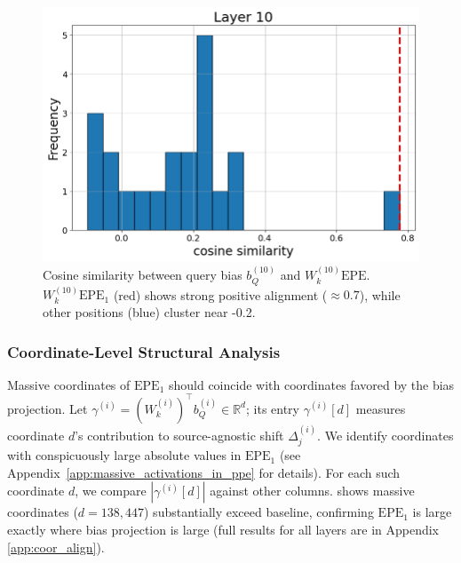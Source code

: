 \documentclass[11pt]{article}
\begin{document}
\begin{figure}[t]
  \includegraphics[width=\columnwidth]{figures/obs2_layer10.png}
  \caption{Cosine similarity between query bias $b_Q^{(10)}$ and $W_k^{(10)}\mathrm{EPE}$. $W_k^{(10)}\mathrm{EPE}_1$ (red) shows strong positive alignment ($\approx 0.7$), while other positions (blue) cluster near -0.2.}
  \label{fig:obs2_layer10}
\end{figure}

\subsubsection{Coordinate-Level Structural Analysis}
\label{sec:wk_structure}
Massive coordinates of $\mathrm{EPE}_1$ should coincide with coordinates favored by the bias projection. Let $\gamma^{(i)}=(W_k^{(i)})^\top b_Q^{(i)}\in\mathbb{R}^d$; its entry $\gamma^{(i)}[d]$ measures coordinate $d$'s contribution to source-agnostic shift $\Delta_j^{(i)}$. We identify coordinates with conspicuously large absolute values in 
$\mathrm{EPE}_1$ (see Appendix~\ref{app:massive_activations_in_ppe} for 
details). For each such coordinate $d$, we compare $|\gamma^{(i)}[d]|$ against other columns.  shows massive coordinates ($d{=}138,447$) substantially exceed baseline, confirming $\mathrm{EPE}_1$ is large exactly where bias projection is large (full results for all layers are in Appendix \ref{app:coor_align}).
\end{document}
